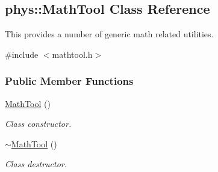 \hypertarget{classphys_1_1MathTool}{
\subsection{phys::MathTool Class Reference}
\label{classphys_1_1MathTool}
}


This provides a number of generic math related utilities.  




{\ttfamily \#include $<$mathtool.h$>$}

\subsubsection*{Public Member Functions}
\begin{DoxyCompactItemize}
\item 
\hypertarget{classphys_1_1MathTool_af84aa9b6559d4fb8b23a9d308ceb80e6}{
\hyperlink{classphys_1_1MathTool_af84aa9b6559d4fb8b23a9d308ceb80e6}{MathTool} ()}
\label{classphys_1_1MathTool_af84aa9b6559d4fb8b23a9d308ceb80e6}

\begin{DoxyCompactList}\small\item\em Class constructor. \item\end{DoxyCompactList}\item 
\hypertarget{classphys_1_1MathTool_a052abf23a87a799b0233506bb685a72f}{
\hyperlink{classphys_1_1MathTool_a052abf23a87a799b0233506bb685a72f}{$\sim$MathTool} ()}
\label{classphys_1_1MathTool_a052abf23a87a799b0233506bb685a72f}

\begin{DoxyCompactList}\small\item\em Class destructor. \item\end{DoxyCompactList}\end{DoxyCompactItemize}

